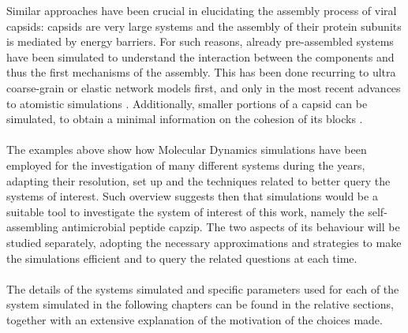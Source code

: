 Similar approaches have been crucial in elucidating the assembly process of viral capsids: capsids are very large systems and the assembly of their protein subunits is mediated by energy barriers. For such reasons, already pre-assembled systems have been simulated to understand the interaction between the components and thus the first mechanisms of the assembly. This has been done recurring to ultra coarse-grain or elastic network models \cite{Grime2016} first, and only in the most recent advances to atomistic simulations \cite{Perilla2016,Hadden2018}. Additionally, smaller portions of a capsid can be simulated, to obtain a minimal information on the cohesion of its blocks \cite{AbiMansour2014}.


\paragraph{}
The examples above show how Molecular Dynamics simulations have been employed for the investigation of many different systems during the years, adapting their resolution, set up and the techniques related to better query the systems of interest. Such overview suggests then that simulations would be a suitable tool to investigate the system of interest of this work, namely the self-assembling antimicrobial peptide capzip. The two aspects of its behaviour will be studied separately, adopting the necessary approximations and strategies to make the simulations efficient and to query the related questions at each time.

\paragraph{}
The details of the systems simulated and specific parameters used for each of the system simulated in the following chapters can be found in the relative sections, together with an extensive explanation of the motivation of the choices made.